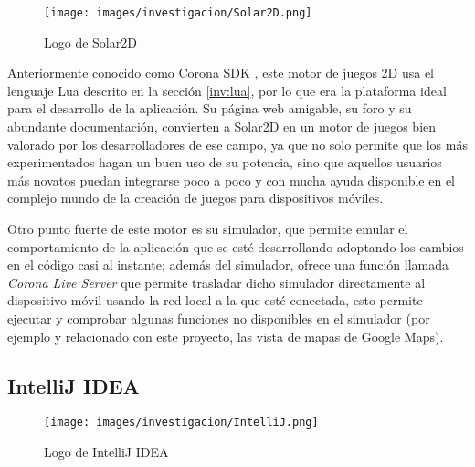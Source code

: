             \begin{figure*}[h]
            \label{figura:solar2d}

                \centering
                \texttt{[image: images/investigacion/Solar2D.png]}
                \caption{Logo de Solar2D}

            \end{figure*}

            Anteriormente conocido como Corona SDK \cite{Corona-Labs}, este motor de juegos 2D usa el lenguaje Lua descrito en la sección \ref{inv:lua}, por lo que era la plataforma ideal para el desarrollo de la aplicación. Su página web amigable, su foro y su abundante documentación, convierten a Solar2D en un motor de juegos bien valorado por los desarrolladores de ese campo, ya que no solo permite que los más experimentados hagan un buen uso de su potencia, sino que aquellos usuarios más novatos puedan integrarse poco a poco y con mucha ayuda disponible en el complejo mundo de la creación de juegos para dispositivos móviles.

            Otro punto fuerte de este motor es su simulador, que permite emular el comportamiento de la aplicación que se esté desarrollando adoptando los cambios en el código casi al instante; además del simulador, ofrece una función llamada \textit{Corona Live Server} que permite trasladar dicho simulador directamente al dispositivo móvil usando la red local a la que esté conectada, esto permite ejecutar y comprobar algunas funciones no disponibles en el simulador (por ejemplo y relacionado con este proyecto, las vista de mapas de Google Maps).




        \subsection{IntelliJ IDEA}

            \nocite{Jetbrains-IntelliJ}

            \begin{figure*}[h]
            \label{figura:intellij}

                \centering
                \texttt{[image: images/investigacion/IntelliJ.png]}
                \caption{Logo de IntelliJ IDEA}

            \end{figure*}

